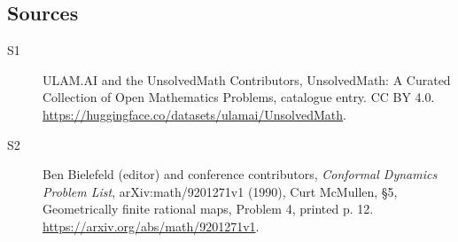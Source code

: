 \documentclass[11pt]{article}
\begin{document}
\subsection{Sources}
\begin{description}
\item[\hypertarget{source:statement:1}{S1}] ULAM.AI and the UnsolvedMath Contributors, UnsolvedMath: A Curated Collection of Open Mathematics Problems, catalogue entry. CC BY 4.0. \url{https://huggingface.co/datasets/ulamai/UnsolvedMath}.
\item[\hypertarget{source:statement:2}{S2}] Ben Bielefeld (editor) and conference contributors, \emph{Conformal Dynamics Problem List}, arXiv:math/9201271v1 (1990), Curt McMullen, \S5, Geometrically finite rational maps, Problem 4, printed p. 12. \url{https://arxiv.org/abs/math/9201271v1}.
\end{description}
\label{end:statement}
\end{document}
